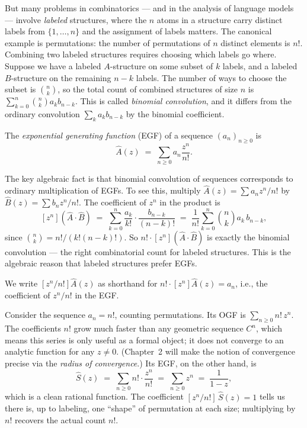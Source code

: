 But many problems in combinatorics --- and in the analysis of language models --- involve \emph{labeled} structures, where the $n$ atoms in a structure carry distinct labels from $\{1, \ldots, n\}$ and the assignment of labels matters. The canonical example is permutations: the number of permutations of $n$ distinct elements is $n!$. Combining two labeled structures requires choosing which labels go where. Suppose we have a labeled $A$-structure on some subset of $k$ labels, and a labeled $B$-structure on the remaining $n-k$ labels. The number of ways to choose the subset is $\binom{n}{k}$, so the total count of combined structures of size $n$ is $\sum_{k=0}^n \binom{n}{k} a_k b_{n-k}$. This is called \emph{binomial convolution}, and it differs from the ordinary convolution $\sum_k a_k b_{n-k}$ by the binomial coefficient.

\begin{definition}
The \emph{exponential generating function} (EGF) of a sequence $(a_n)_{n \ge 0}$ is
\[
  \hat{A}(z) \;=\; \sum_{n \ge 0} a_n \frac{z^n}{n!}.
\]
\end{definition}

The key algebraic fact is that binomial convolution of sequences corresponds to ordinary multiplication of EGFs. To see this, multiply $\hat{A}(z) = \sum a_n z^n/n!$ by $\hat{B}(z) = \sum b_n z^n/n!$. The coefficient of $z^n$ in the product is
\[
  [z^n](\hat A \cdot \hat B) \;=\; \sum_{k=0}^n \frac{a_k}{k!}\cdot\frac{b_{n-k}}{(n-k)!}
  \;=\; \frac{1}{n!}\sum_{k=0}^n \binom{n}{k}a_k\,b_{n-k},
\]
since $\binom{n}{k} = n!/(k!(n-k)!)$. So $n!\cdot[z^n](\hat A \cdot \hat B)$ is exactly the binomial convolution --- the right combinatorial count for labeled structures. This is the algebraic reason that labeled structures prefer EGFs.

We write $[z^n/n!]\hat{A}(z)$ as shorthand for $n!\cdot [z^n]\hat{A}(z) = a_n$, i.e., the coefficient of $z^n/n!$ in the EGF.

\begin{example}
Consider the sequence $a_n = n!$, counting permutations. Its OGF is $\sum_{n \ge 0} n! \, z^n$. The coefficients $n!$ grow much faster than any geometric sequence $C^n$, which means this series is only useful as a formal object; it does not converge to an analytic function for any $z \ne 0$. (Chapter~2 will make the notion of convergence precise via the \emph{radius of convergence}.) Its EGF, on the other hand, is
\[
  \hat{S}(z) \;=\; \sum_{n \ge 0} n! \cdot \frac{z^n}{n!} \;=\; \sum_{n \ge 0} z^n \;=\; \frac{1}{1-z},
\]
which is a clean rational function. The coefficient $[z^n/n!]\,\hat{S}(z) = 1$ tells us there is, up to labeling, one ``shape'' of permutation at each size; multiplying by $n!$ recovers the actual count $n!$.
\end{example}

